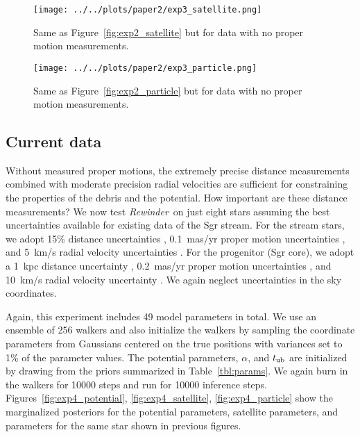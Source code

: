 \documentclass[letterpaper,12pt,preprint]{aastex}
\newcommand{\tub}{t_{\rm ub}}
\newcommand{\Loffset}{\alpha}
\newcommand{\rewinder}{\emph{Rewinder}}
\begin{document}
\begin{figure}[!ht]
\begin{center}
\texttt{[image: ../../plots/paper2/exp3\_satellite.png]}
\caption{ Same as Figure~\ref{fig:exp2_satellite} but for data with no proper motion measurements.  }\label{fig:exp3_satellite}
\end{center}
\end{figure}

\begin{figure}[!ht]
\begin{center}
\texttt{[image: ../../plots/paper2/exp3\_particle.png]}
\caption{ Same as Figure~\ref{fig:exp2_particle} but for data with no proper motion measurements.  }\label{fig:exp3_particle}
\end{center}
\end{figure}

\subsection{Current data}\label{sec:exp4}
Without measured proper motions, the extremely precise distance measurements combined with moderate precision radial velocities are sufficient for constraining the properties of the debris and the potential. How important are these distance measurements? We now test \rewinder\, on just eight stars assuming the best uncertainties available for existing data of the Sgr stream. For the stream stars, we adopt 15\% distance uncertainties \citep[typical for M giants, e.g.,][]{majewski04}, 0.1~mas/yr proper motion uncertainties \citep{koposov13}, and 5~km/s radial velocity uncertainties \citep{majewski04}. For the progenitor (Sgr core), we adopt a 1~kpc distance uncertainty \citep{kunder09}, 0.2~mas/yr proper motion uncertainties \citep{pryor10}, and 10~km/s radial velocity uncertainty \citep{frinchaboy12}. We again neglect uncertainties in the sky coordinates.

Again, this experiment includes 49 model parameters in total. We use an ensemble of 256 walkers and also initialize the walkers by sampling the coordinate parameters from Gaussians centered on the true positions with variances set to 1\% of the parameter values. The potential parameters, $\Loffset$, and $\tub$ are initialized by drawing from the priors summarized in Table~\ref{tbl:params}. We again burn in the walkers for 10000 steps and run for 10000 inference steps. Figures~\ref{fig:exp4_potential}, \ref{fig:exp4_satellite}, \ref{fig:exp4_particle} show the marginalized posteriors for the potential parameters, satellite parameters, and parameters for the same star shown in previous figures. %
\end{document}
